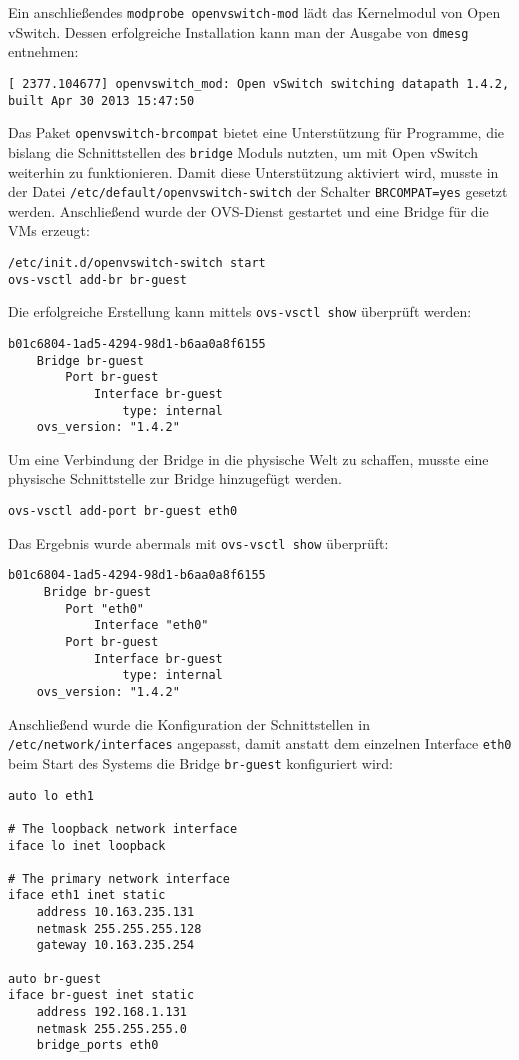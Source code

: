 Ein anschließendes \verb#modprobe openvswitch-mod# lädt das Kernelmodul von Open vSwitch. Dessen erfolgreiche Installation kann man der Ausgabe von \verb#dmesg# entnehmen:
\setupVerbatimOut
\begin{verbatim}
[ 2377.104677] openvswitch_mod: Open vSwitch switching datapath 1.4.2, built Apr 30 2013 15:47:50
\end{verbatim}
Das Paket \verb#openvswitch-brcompat# bietet eine Unterstützung für Programme, die bislang die Schnittstellen des \verb#bridge# Moduls nutzten, um mit Open vSwitch weiterhin zu funktionieren. Damit diese Unterstützung aktiviert wird, musste in der Datei \verb#/etc/default/openvswitch-switch# der Schalter \verb#BRCOMPAT=yes# gesetzt werden. Anschließend wurde der OVS-Dienst gestartet und eine Bridge für die VMs erzeugt:
\setupVerbatimBash
\begin{verbatim}
/etc/init.d/openvswitch-switch start
ovs-vsctl add-br br-guest
\end{verbatim}
Die erfolgreiche Erstellung kann mittels \verb#ovs-vsctl show# überprüft werden:
\setupVerbatimOut
\begin{verbatim}
b01c6804-1ad5-4294-98d1-b6aa0a8f6155
    Bridge br-guest
        Port br-guest
            Interface br-guest
                type: internal
    ovs_version: "1.4.2"
\end{verbatim} 
Um eine Verbindung der Bridge in die physische Welt zu schaffen, musste eine physische Schnittstelle zur Bridge hinzugefügt werden.
\setupVerbatimBash
\begin{verbatim}
ovs-vsctl add-port br-guest eth0
\end{verbatim}
Das Ergebnis wurde abermals mit \verb#ovs-vsctl show# überprüft:
\setupVerbatimOut
\begin{verbatim}
b01c6804-1ad5-4294-98d1-b6aa0a8f6155
     Bridge br-guest
        Port "eth0"
            Interface "eth0"
        Port br-guest
            Interface br-guest
                type: internal
    ovs_version: "1.4.2"
\end{verbatim}

Anschließend wurde die Konfiguration der Schnittstellen in \verb#/etc/network/interfaces# angepasst, damit anstatt dem einzelnen Interface \verb#eth0# beim Start des Systems die Bridge \verb#br-guest# konfiguriert wird:
\setupVerbatimOut
\begin{verbatim}
auto lo eth1

# The loopback network interface
iface lo inet loopback

# The primary network interface
iface eth1 inet static
    address 10.163.235.131
    netmask 255.255.255.128
	gateway 10.163.235.254

auto br-guest
iface br-guest inet static
	address 192.168.1.131
	netmask 255.255.255.0
	bridge_ports eth0
    
\end{verbatim}

